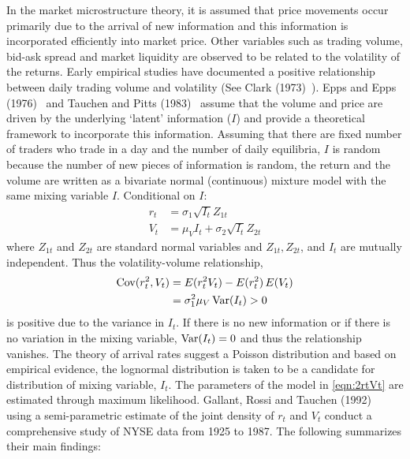 In the market microstructure theory, it is assumed that price movements occur primarily due to the arrival of new information and this information is incorporated efficiently into market price. Other variables such as trading volume, bid-ask spread and market liquidity are observed to be related to the volatility of the returns. Early empirical studies have documented a positive relationship between daily trading volume and volatility (See Clark (1973)~\cite{clark}). Epps and Epps (1976)~\cite{epps} and Tauchen and Pitts (1983)~\cite{tauchenpitts} assume that the volume and price are driven by the underlying `latent' information ($I$) and provide a theoretical framework to incorporate this information. Assuming that there are fixed number of traders who trade in a day and the number of daily equilibria, $I$ is random because the number of new pieces of information is random, the return and the volume are written as a bivariate normal (continuous) mixture model with the same mixing variable $I$. Conditional on $I$:
	\begin{equation}\label{eqn:2rtVt}
	\begin{split}
	 r_t&= \sigma_1 \sqrt{I_t}Z_{1t} \\
	 V_t&= \mu_VI_t + \sigma_2 \sqrt{I_t}Z_{2t}
	 \end{split}
	 \end{equation}
where $Z_{1t}$ and $Z_{2t}$ are standard normal variables and $Z_{1t},  Z_{2t}$, and $I_t$ are mutually independent. Thus the volatility-volume relationship,
	\begin{equation}\label{eqn:2covVt}
	\begin{split}
	\cov(r_t^2,V_t)& = E(r_{t}^2V_t) - E(r_t^2) \,E(V_t) \\ 
	&= \sigma_1^2 \mu_V \var(I_t) > 0
	\end{split}
	\end{equation}
is positive due to the variance in $I_t$. If there is no new information or if there is no variation in the mixing variable, $\operatorname{Var}(I_t)= 0$ and thus the relationship vanishes. The theory of arrival rates suggest a
Poisson distribution and based on empirical evidence, the lognormal distribution is taken to be a candidate for distribution of mixing variable, $I_t$. The parameters of the model in \eqref{eqn:2rtVt} are estimated through maximum likelihood. Gallant, Rossi and Tauchen (1992)~\cite{grt} using a semi-parametric estimate of the joint density of $r_t$ and $V_t$ conduct a comprehensive study of NYSE data from 1925 to 1987. The following summarizes their main findings: \\


